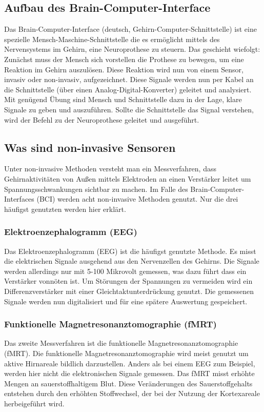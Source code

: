 \documentclass[11pt,ngerman,parskip=half]{scrartcl}
\begin{document}
\subsection{Aufbau des Brain-Computer-Interface} 
Das Brain-Computer-Interface (deutsch, Gehirn-Computer-Schnittstelle) ist eine spezielle Mensch-Maschine-Schnittstelle die es ermöglicht mittels des Nervensystems im Gehirn, eine Neuroprothese zu steuern. Das geschieht wiefolgt: Zunächst muss der Mensch sich vorstellen die Prothese zu bewegen, um eine Reaktion im Gehirn auszulösen. Diese Reaktion wird nun von einem Sensor, invasiv oder non-invasiv, aufgezeichnet. Diese Signale werden nun per Kabel an die Schnittstelle (über einen Analog-Digital-Konverter) geleitet und analysiert. Mit genügend Übung sind Mensch und Schnittstelle dazu in der Lage, klare Signale zu geben und auszuführen. Sollte die Schnittstelle das Signal verstehen, wird der Befehl zu der Neuroprothese geleitet und ausgeführt.
\parencite{uebersicht,bciuinvasiv}
\subsection{Was sind non-invasive Sensoren}
Unter non-invasive Methoden versteht man ein Messverfahren, dass Gehirnaktivitäten von Außen mittels Elektroden an einen Verstärker leitet um Spannungsschwankungen sichtbar zu machen. Im Falle des Brain-Computer-Interfaces (BCI) werden acht non-invasive Methoden genutzt. Nur die drei häufigst genutzten werden hier erklärt.
\parencite{methoden}
\subsubsection{Elektroenzephalogramm (EEG)}
Das Elektroenzephalogramm (EEG) ist die häufigst genutzte Methode. Es misst die elektrischen Signale ausgehend aus den Nervenzellen des Gehirns. Die Signale werden allerdings nur mit 5-100 Mikrovolt gemessen, was dazu führt dass ein Verstärker vonnöten ist. Um Störungen der Spannungen zu vermeiden wird ein Differenzverstärker mit einer Gleichtaktunterdrückung genutzt. Die gemessenen Signale werden nun digitalisiert und für eine spätere Auswertung gespeichert.
\parencite{eeg}
\subsubsection{Funktionelle Magnetresonanztomographie (fMRT)}
Das zweite Messverfahren ist die funktionelle Magnetresonanztomographie (fMRT). Die funktionelle Magnetresonanztomographie wird meist genutzt um aktive Hirnareale bildlich darzustellen. Anders als bei einem EEG zum Beispiel, werden hier nicht die elektronischen Signale gemessen. Das fMRT misst erhöhte Mengen an sauerstoffhaltigem Blut. Diese Veränderungen des Sauerstoffgehalts entstehen durch den erhöhten Stoffwechsel, der bei der Nutzung der Kortexareale herbeigeführt wird. 
\parencite{fmrt}
\end{document}
